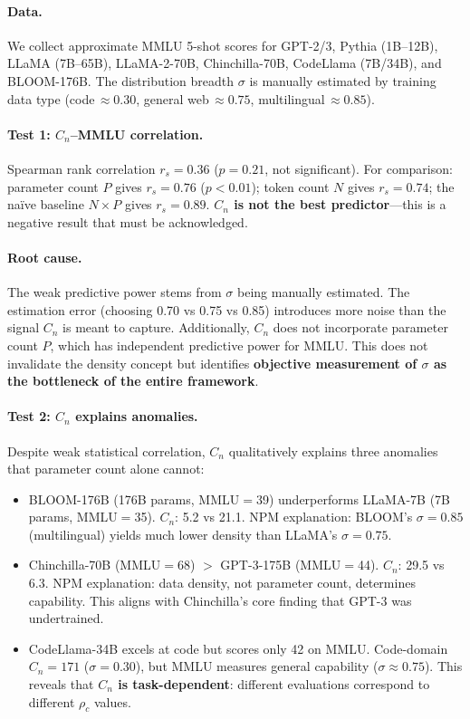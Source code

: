 \documentclass[11pt,a4paper]{article}
\newcommand{\rhoc}{\rho_c}
\begin{document}
\paragraph{Data.}
We collect approximate MMLU 5-shot scores for GPT-2/3, Pythia (1B--12B), LLaMA (7B--65B), LLaMA-2-70B, Chinchilla-70B, CodeLlama (7B/34B), and BLOOM-176B. The distribution breadth $\sigma$ is manually estimated by training data type (code$\,\approx 0.30$, general web$\,\approx 0.75$, multilingual$\,\approx 0.85$).

\paragraph{Test 1: $C_n$--MMLU correlation.}
Spearman rank correlation $r_s = 0.36$ ($p=0.21$, not significant). For comparison: parameter count $P$ gives $r_s=0.76$ ($p<0.01$); token count $N$ gives $r_s=0.74$; the na\"ive baseline $N\times P$ gives $r_s=0.89$. \textbf{$C_n$ is not the best predictor}---this is a negative result that must be acknowledged.

\paragraph{Root cause.}
The weak predictive power stems from $\sigma$ being manually estimated. The estimation error (choosing 0.70 vs 0.75 vs 0.85) introduces more noise than the signal $C_n$ is meant to capture. Additionally, $C_n$ does not incorporate parameter count $P$, which has independent predictive power for MMLU. This does not invalidate the density concept but identifies \textbf{objective measurement of $\sigma$ as the bottleneck of the entire framework}.

\paragraph{Test 2: $C_n$ explains anomalies.}
Despite weak statistical correlation, $C_n$ qualitatively explains three anomalies that parameter count alone cannot:
\begin{itemize}[nosep]
  \item BLOOM-176B (176B params, MMLU$=$39) underperforms LLaMA-7B (7B params, MMLU$=$35). $C_n$: 5.2 vs 21.1. NPM explanation: BLOOM's $\sigma=0.85$ (multilingual) yields much lower density than LLaMA's $\sigma=0.75$.
  \item Chinchilla-70B (MMLU$=$68) $>$ GPT-3-175B (MMLU$=$44). $C_n$: 29.5 vs 6.3. NPM explanation: data density, not parameter count, determines capability. This aligns with Chinchilla's core finding that GPT-3 was undertrained.
  \item CodeLlama-34B excels at code but scores only 42 on MMLU. Code-domain $C_n=171$ ($\sigma=0.30$), but MMLU measures general capability ($\sigma\approx 0.75$). This reveals that \textbf{$C_n$ is task-dependent}: different evaluations correspond to different $\rhoc$ values.
\end{itemize}
\end{document}
